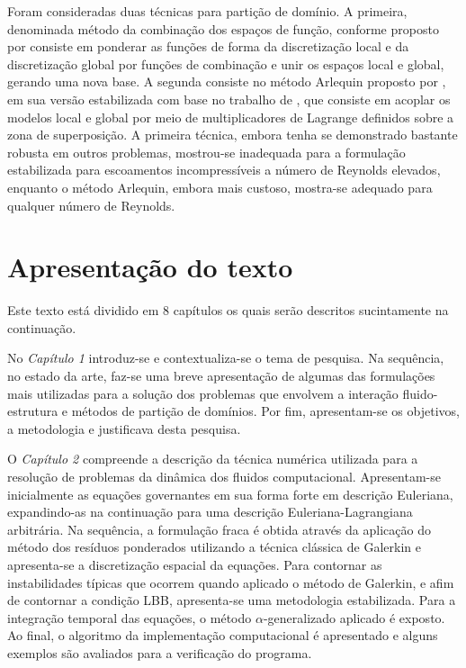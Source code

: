 Foram consideradas duas técnicas para partição de domínio. A primeira, denominada método da combinação dos espaços de função, conforme proposto por  consiste em ponderar as funções de forma da discretização local e da discretização global por funções de combinação e unir os espaços local e global, gerando uma nova base. A segunda consiste no método Arlequin proposto por , em sua versão estabilizada com base no trabalho de , que consiste em acoplar os modelos local e global por meio de multiplicadores de Lagrange definidos sobre a zona de superposição. A primeira técnica, embora tenha se demonstrado bastante robusta em outros problemas, mostrou-se inadequada para a formulação estabilizada para escoamentos incompressíveis a número de Reynolds elevados, enquanto o método Arlequin, embora mais custoso, mostra-se adequado para qualquer número de Reynolds.

\section{Apresentação do texto}

Este texto está dividido em 8 capítulos os quais serão descritos sucintamente na continuação.

No \textit{Capítulo 1} introduz-se e contextualiza-se o tema de pesquisa. Na sequência, no estado da arte, faz-se uma breve apresentação de algumas das formulações mais utilizadas para a solução dos problemas que envolvem a interação fluido-estrutura e métodos de partição de domínios. Por fim, apresentam-se os objetivos, a metodologia e justificava desta pesquisa.

O \textit{Capítulo 2} compreende a descrição da técnica numérica utilizada para a resolução de problemas da dinâmica dos fluidos computacional. 
Apresentam-se inicialmente as equações governantes em sua forma forte em descrição Euleriana, expandindo-as na continuação para uma descrição Euleriana-Lagrangiana arbitrária. Na sequência, a formulação fraca é obtida através da aplicação do método dos resíduos ponderados utilizando a técnica clássica de Galerkin e apresenta-se a discretização espacial da equações. Para contornar as instabilidades típicas que ocorrem quando aplicado o método de Galerkin, e afim de contornar a condição LBB, apresenta-se uma metodologia estabilizada. Para a integração temporal das equações, o método $\alpha$-generalizado aplicado é exposto. Ao final, o algoritmo da implementação computacional é apresentado e alguns exemplos são avaliados para a verificação do programa.

